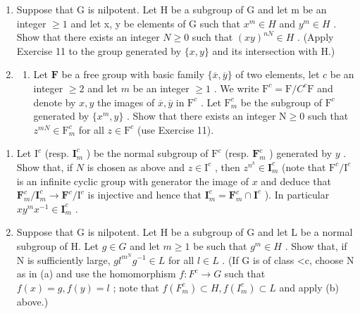 \begin{enumerate}
\def\labelenumi{\arabic{enumi}.}
\setcounter{enumi}{11}
\item
  Suppose that G is nilpotent. Let H be a subgroup of G and let m be an integer \(\geqslant 1\) and let x, y be elements of G such that \(x^{m} \in H\) and \(y^{m} \in H\) . Show that there exists an integer \(N \geqslant 0\) such that \((xy)^{nN} \in H\) . (Apply Exercise 11 to the group generated by \(\{x, y\}\) and its intersection with H.)
\item
  \begin{enumerate}
  \def\labelenumii{(\alph{enumii})}
  \tightlist
  \item
    Let \(\mathbf{F}\) be a free group with basic family \(\{\overline{x},\overline{y}\}\) of two elements, let \(c\) be an integer \(\geqslant 2\) and let \(m\) be an integer \(\geqslant 1\) . We write \(\mathrm{F}^c = \mathrm{F} / C^c\mathrm{F}\) and denote by \(x,y\) the images of \(\overline{x},\overline{y}\) in \(\mathrm{F}^c\) . Let \(\mathrm{F}_m^c\) be the subgroup of \(\mathrm{F}^c\) generated by \(\{x^{m},y\}\) . Show that there exists an integer \(\mathrm{N}\geqslant 0\) such that \(z^{mN}\in \mathrm{F}_{m}^{c}\) for all \(z\in \mathrm{F}^c\) (use Exercise 11).
  \end{enumerate}
\end{enumerate}

\begin{enumerate}
\def\labelenumi{(\alph{enumi})}
\setcounter{enumi}{1}
\item
  Let \(\mathrm{I}^c\) (resp. \(\mathbf{I}_m^c\) ) be the normal subgroup of \(\mathrm{F}^c\) (resp. \(\mathbf{F}_m^c\) ) generated by \(y\) . Show that, if \(N\) is chosen as above and \(z \in \mathrm{I}^c\) , then \(z^{n^k} \in \mathbf{I}_m^c\) (note that \(\mathrm{F}^c / \mathrm{I}^c\) is an infinite cyclic group with generator the image of \(x\) and deduce that \(\mathbf{F}_m^c / \mathbf{I}_m^c \to \mathbf{F}^c / \mathrm{I}^c\) is injective and hence that \(\mathbf{I}_m^c = \mathbf{F}_m^c \cap \mathbf{I}^c\) ). In particular \(xy^m x^{-1} \in \mathbf{I}_m^c\) .
\item
  Suppose that G is nilpotent. Let H be a subgroup of G and let L be a normal subgroup of H. Let \(g \in G\) and let \(m \geqslant 1\) be such that \(g^{m} \in H\) . Show that, if N is sufficiently large, \(gl^{m^{N}} g^{-1} \in L\) for all \(l \in L\) . (If G is of class \textless c, choose N as in (a) and use the homomorphism \(f: F^{c} \to G\) such that \(f(x) = g, f(y) = l\) ; note that \(f(F_{m}^{c}) \subset H, f(I_{m}^{c}) \subset L\) and apply (b) above.)
\end{enumerate}

